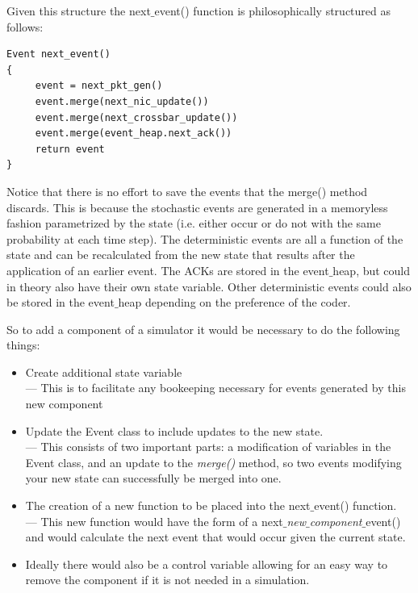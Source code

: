 \documentclass{IEEEtran}%
\begin{document}
Given this structure the next$\_$event() function is philosophically structured as follows:

\begin{verbatim}
Event next_event()
{
     event = next_pkt_gen()
     event.merge(next_nic_update())
     event.merge(next_crossbar_update())
     event.merge(event_heap.next_ack())
     return event
}
\end{verbatim}

Notice that there is no effort to save the events that the merge() method discards.  This is because the stochastic events are generated in a memoryless fashion parametrized by the state (i.e. either occur or do not with the same probability at each time step).  The deterministic events are all a function of the state and can be recalculated from the new state that results after the application of an earlier event.  The ACKs are stored in the event$\_$heap, but could in theory also have their own state variable.  Other deterministic events could also be stored in the event$\_$heap depending on the preference of the coder.

So to add a component of a simulator it would be necessary to do the following things:
\begin{itemize}
\item Create additional state variable\\
--- This is to facilitate any bookeeping necessary for events generated by this new component
\item Update the Event class to include updates to the new state.\\
--- This consists of two important parts: a modification of variables in the Event class, and an update to the {\it merge()} method, so two events modifying your new state can successfully be merged into one.
\item The creation of a new function to be placed into the next$\_$event() function.\\
--- This new function would have the form of a next$\_${\it new$\_$component}$\_$event() and would calculate the next event that would occur given the current state.
\item Ideally there would also be a control variable allowing for an easy way to remove the component if it is not needed in a simulation.
\end{itemize}
\end{document}
